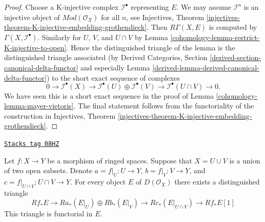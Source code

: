 \begin{proof}

Choose a K-injective complex $\mathcal{I}^\bullet$
representing $E$. We may assume $\mathcal{I}^n$ is an injective
object of $\textit{Mod}(\mathcal{O}_X)$ for all $n$, see
Injectives, Theorem
\ref{injectives-theorem-K-injective-embedding-grothendieck}.
Then $R\Gamma(X, E)$ is computed by $\Gamma(X, \mathcal{I}^\bullet)$.
Similarly for $U$, $V$, and $U \cap V$ by
Lemma \ref{cohomology-lemma-restrict-K-injective-to-open}.
Hence the distinguished triangle of the lemma is the distinguished
triangle associated (by
Derived Categories, Section
\ref{derived-section-canonical-delta-functor} and especially
Lemma \ref{derived-lemma-derived-canonical-delta-functor})
to the short exact sequence of complexes
$$
0 \to
\mathcal{I}^\bullet(X) \to
\mathcal{I}^\bullet(U) \oplus \mathcal{I}^\bullet(V) \to
\mathcal{I}^\bullet(U \cap V) \to
0.
$$
We have seen this is a short exact sequence in the proof of
Lemma \ref{cohomology-lemma-mayer-vietoris}.
The final statement follows from the functoriality of the construction
in Injectives, Theorem
\ref{injectives-theorem-K-injective-embedding-grothendieck}.
\end{proof}

\begin{lemma}
\label{cohomology-lemma-unbounded-relative-mayer-vietoris}
\href{https://stacks.math.columbia.edu/tag/08HZ}{\texttt{Stacks tag 08HZ}}

Let $f : X \to Y$ be a morphism of ringed spaces.
Suppose that $X = U \cup V$ is a union of two open subsets.
Denote $a = f|_U : U \to Y$, $b = f|_V : V \to Y$, and
$c = f|_{U \cap V} : U \cap V \to Y$.
For every object $E$ of $D(\mathcal{O}_X)$ there exists a
distinguished triangle
$$
Rf_*E \to
Ra_*(E|_U) \oplus Rb_*(E|_V) \to
Rc_*(E|_{U \cap V}) \to
Rf_*E[1]
$$
This triangle is functorial in $E$.
\end{lemma}

